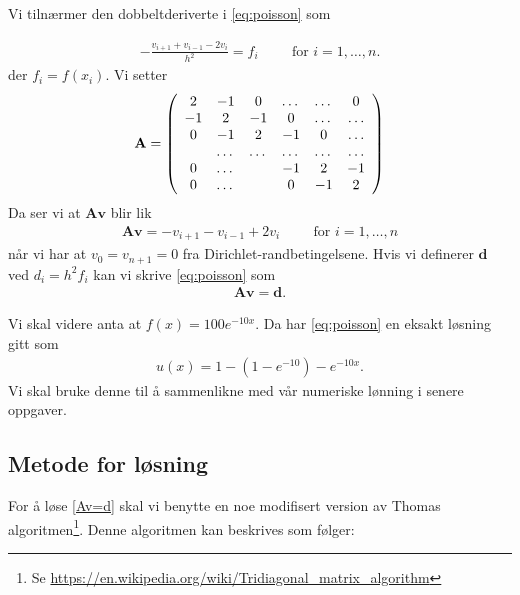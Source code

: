 \documentclass[11pt]{article}
\renewcommand{\vec}{\mathbf} %
\begin{document}
Vi tilnærmer den dobbeltderiverte i \eqref{eq:poisson} som

\begin{align}
  - \frac{ v_{i+1} + v_{i-1} - 2v_i }{ h^2 } =
  f_i\hspace{1cm}\text{for } i = 1,\dots,n.
\end{align}
der $f_i = f(x_i)$. Vi setter 
\begin{align*}
      {\bf A} = \left(\begin{array}{cccccc}
                           2& -1& 0 &\dots   & \dots &0 \\
                           -1 & 2 & -1 &0 &\dots &\dots \\
                           0&-1 &2 & -1 & 0 & \dots \\
                           & \dots   & \dots &\dots   &\dots & \dots \\
                           0&\dots   &  &-1 &2& -1 \\
                           0&\dots    &  & 0  &-1 & 2 \\
                      \end{array} \right)
\end{align*}
Da ser vi at $\vec A \vec v$ blir lik 
\begin{align*}
  \vec A \vec v = -v_{i+1} - v_{i-1} + 2v_i\hspace{1cm}\text{for } i = 1,\dots,n
\end{align*}
når vi har at $v_0 = v_{n+1} = 0$ fra Dirichlet-randbetingelsene. Hvis
vi definerer $\vec d$ ved $d_i = h^2f_i$ kan vi skrive
\eqref{eq:poisson} som 
\begin{align}
  \vec A \vec v = \vec d.\label{Av=d}
\end{align}
 

Vi skal videre anta at $f(x) = 100 e^{-10x}$. Da har
\eqref{eq:poisson} en eksakt løsning gitt som
 \begin{align}
u(x) = 1 -\left(1-e^{-10}\right) - e^{-10x}.\label{eq:exact}
\end{align} 
Vi skal bruke denne til å
sammenlikne med vår numeriske lønning i senere oppgaver.

\subsection{Metode for løsning}
For å løse \eqref{Av=d} skal vi benytte en noe modifisert version av
Thomas algoritmen\footnote{Se
  \url{https://en.wikipedia.org/wiki/Tridiagonal_matrix_algorithm}}. Denne
algoritmen kan beskrives som følger: 
\end{document}
